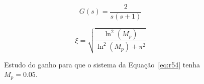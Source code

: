 \documentclass[a4paper]{article}
\begin{document}
\begin{equation}
   G(s)=\frac{2}{s(s+1)}
   \label{eq:r54}
\end{equation}

\begin{equation}
   \xi=\sqrt{\frac{\ln^2(M_p)}{\ln^2(M_p)+\pi^2}}
   \label{eq:manual_tab2}
\end{equation}

\begin{figure}[h]
  \caption{Estudo do ganho para que o sistema da Equação~\ref{eq:r54} tenha $M_p=0.05$.}
   \label{fig:r54}
\end{figure}


 
\end{document}
